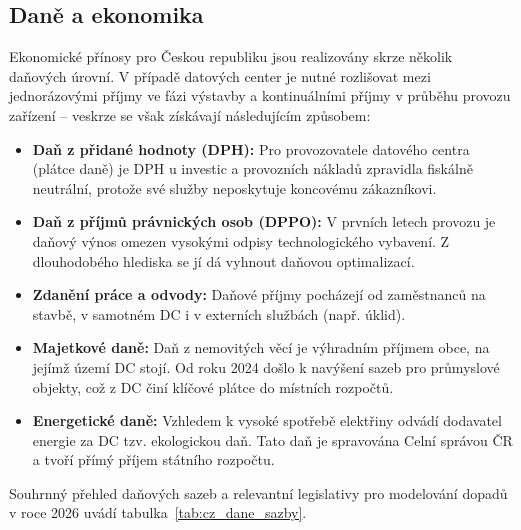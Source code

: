\subsection{Daně a ekonomika}
\label{subsec:cz_dane}

Ekonomické přínosy pro Českou republiku jsou realizovány skrze několik daňových úrovní. V případě datových center je nutné rozlišovat mezi jednorázovými příjmy ve fázi výstavby a kontinuálními příjmy v průběhu provozu zařízení -- veskrze se však získávají následujícím způsobem:

\begin{itemize}

\item \textbf{Daň z přidané hodnoty (DPH):} Pro provozovatele datového centra (plátce daně) je DPH u investic a provozních nákladů zpravidla fiskálně neutrální, protože své služby neposkytuje koncovému zákazníkovi.

\item \textbf{Daň z příjmů právnických osob (DPPO):} V prvních letech provozu je daňový výnos omezen vysokými odpisy technologického vybavení. Z dlouhodobého hlediska se jí dá vyhnout daňovou optimalizací.

\item \textbf{Zdanění práce a odvody:} Daňové příjmy pocházejí od zaměstnanců na stavbě, v samotném DC i v externích službách (např. úklid). 

\item \textbf{Majetkové daně:} Daň z nemovitých věcí je výhradním příjmem obce, na jejímž území DC stojí. Od roku 2024 došlo k navýšení sazeb pro průmyslové objekty, což z DC činí klíčové plátce do místních rozpočtů.

\item \textbf{Energetické daně:} Vzhledem k vysoké spotřebě elektřiny odvádí dodavatel energie za DC tzv. ekologickou daň. Tato daň je spravována Celní správou ČR a tvoří přímý příjem státního rozpočtu.

\end{itemize}

Souhrnný přehled daňových sazeb a relevantní legislativy pro modelování dopadů v roce 2026 uvádí tabulka~\ref{tab:cz_dane_sazby}.

